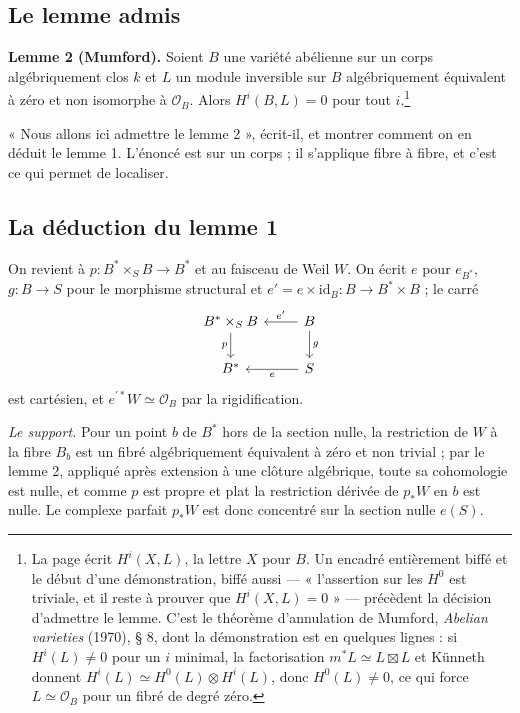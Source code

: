 \documentclass[11pt,a4paper]{article}
\begin{document}
\subsection*{Le lemme admis}

\textbf{Lemme 2 (Mumford).} Soient $B$ une variété abélienne sur un corps
algébriquement clos $k$ et $L$ un module inversible sur $B$ algébriquement
équivalent à zéro et non isomorphe à $\mathcal{O}_B$. Alors $H^{i}(B, L) = 0$
pour tout $i$.\footnote{La page écrit $H^{i}(X, L)$, la lettre $X$ pour $B$.
Un encadré entièrement biffé et le début d'une démonstration, biffé aussi —
« l'assertion sur les $H^{0}$ est triviale, et il reste à prouver que
$H^{i}(X, L) = 0$ » — précèdent la décision d'admettre le lemme. C'est le
théorème d'annulation de Mumford, \emph{Abelian varieties} (1970), § 8, dont
la démonstration est en quelques lignes : si $H^{i}(L) \neq 0$ pour un $i$
minimal, la factorisation $m^{*}L \simeq L \boxtimes L$ et Künneth donnent
$H^{i}(L) \simeq H^{0}(L) \otimes H^{i}(L)$, donc $H^{0}(L) \neq 0$, ce qui
force $L \simeq \mathcal{O}_B$ pour un fibré de degré zéro.}

« Nous allons ici admettre le lemme 2 », écrit-il, et montrer comment on en
déduit le lemme 1. L'énoncé est sur un corps ; il s'applique fibre à fibre,
et c'est ce qui permet de localiser.

\subsection*{La déduction du lemme 1}

On revient à $p \colon B^{*} \times_S B \to B^{*}$ et au faisceau de Weil $W$.
On écrit $e$ pour $e_{B^{*}}$, $g \colon B \to S$ pour le morphisme
structural et $e' = e \times \mathrm{id}_B \colon B \to B^{*} \times B$ ;
le carré
\[
\begin{tikzcd}
B^{*} \times_S B \arrow[d, "p"'] & B \arrow[l, "e'"'] \arrow[d, "g"] \\
B^{*} & S \arrow[l, "e"]
\end{tikzcd}
\]
est cartésien, et $e^{\prime *}W \simeq \mathcal{O}_B$ par la rigidification.

\emph{Le support.} Pour un point $b$ de $B^{*}$ hors de la section nulle, la
restriction de $W$ à la fibre $B_b$ est un fibré algébriquement équivalent à
zéro et non trivial ; par le lemme 2, appliqué après extension à une clôture
algébrique, toute sa cohomologie est nulle, et comme $p$ est propre et plat
la restriction dérivée de $p_{*}W$ en $b$ est nulle. Le complexe parfait
$p_{*}W$ est donc concentré sur la section nulle $e(S)$.
\end{document}
